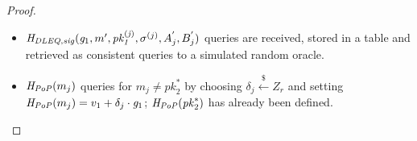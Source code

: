 \begin{proof}
\begin{itemize}
\item $\mathit{H}_{\mathit{DLEQ}, \mathit{sig}}(\mathit{g}_{1}, m', \mathit{pk_{1}^{(j)}}, \sigma^{(j)}, A_j^{'}, B_j^{'})$ queries are received, stored in a table 
and retrieved as consistent queries to a simulated random oracle. %
\item $\mathit{H}_{\mathit{PoP}}(m_j)$ queries for $m_j \neq \mathit{pk}_2^*$ by choosing $\delta_j \xleftarrow{\$} \mathit{Z}_r$ 
and setting $\mathit{H}_{\mathit{PoP}}(m_j) = v_1 + \delta_j \cdot \mathit{g}_{1}$; $\mathit{H}_{\mathit{PoP}}(\mathit{pk}_2^*)$ has already been defined.  
\end{itemize}


\end{proof}
